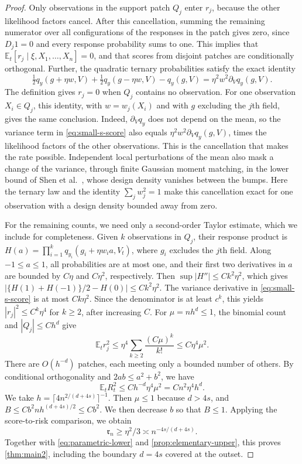 \begin{proof}
Only observations in the support patch $Q_j$ enter $r_j$, because the
other likelihood factors cancel. After this cancellation, summing the remaining numerator over all
configurations of the responses in the patch gives zero, since $D_j1=0$
and every response probability sums to one. This implies that
$\mathbb E_t[r_j\mid\xi,X_1,\ldots,X_n]=0$, and that scores from
disjoint patches are conditionally orthogonal. Further, the
quadratic ternary probabilities satisfy the exact identity
\[
 \tfrac12q_y(g+\eta w,V)+\tfrac12q_y(g-\eta w,V)-q_y(g,V)
 =\eta^2w^2\partial_Vq_y(g,V).
\]
The definition gives $r_j=0$ when $Q_j$ contains no observation. For
one observation $X_i\in Q_j$, this identity, with $w=w_j(X_i)$ and with
$g$ excluding the $j$th field, gives the same conclusion. Indeed,
$\partial_Vq_y$ does not depend on the mean, so the variance term in
\eqref{eq:small-s-score} also equals $\eta^2w^2\partial_Vq_y(g,V)$,
times the likelihood factors of the other observations.
This is the cancellation that makes the rate possible.
Independent local perturbations of the mean also mask a change of the
variance, through finite Gaussian moment matching, in the lower bound of
Shen et al.\ \cite[Sections~2.2 and~5]{ShenGaoWittenHan2020}, whose
design density vanishes between the bumps. Here the ternary law and the
identity $\sum_jw_j^2=1$ make this cancellation exact for one
observation with a design density bounded away from zero.

For the remaining counts, we need only a second-order Taylor
estimate, which we include for completeness. Given $k$ observations in
$Q_j$, their response product is $H(a)=\prod_{i=1}^kq_{y_i}(g_i+\eta w_i a,V_t)$, where
$g_i$ excludes the $j$th field. Along $-1\le a\le1$, all probabilities
are at most one, and their first two derivatives in $a$ are bounded by
$C\eta$ and $C\eta^2$, respectively. Then
$\sup|H''|\le Ck^2\eta^2$, which gives
$|\{H(1)+H(-1)\}/2-H(0)|\le Ck^2\eta^2$.
The variance derivative in \eqref{eq:small-s-score} is at most
$Ck\eta^2$. Since the denominator is at least $c^k$, this yields
$|r_j|^2\le C^k\eta^4$ for $k\ge2$, after increasing $C$.
For $\mu=nh^d\le1$, the binomial count and $|Q_j|\le Ch^d$ give
\[
 \mathbb E_t r_j^2\le
 \eta^4\sum_{k\ge2}\frac{(C\mu)^k}{k!}
 \le C\eta^4\mu^2.
\]
There are $O(h^{-d})$ patches, each meeting only a bounded number of
others. By conditional orthogonality and $2ab\le a^2+b^2$, we have
\[
 \mathbb E_tR_t^2\le C h^{-d}\eta^4\mu^2
 =Cn^2\eta^4h^d.
\]
We take $h=\lceil4n^{2/(d+4s)}\rceil^{-1}$. Then $\mu\le1$ because
$d>4s$, and $B\le Cb^2n h^{(d+4s)/2}\le Cb^2$.
We then decrease $b$ so that $B\le1$. Applying the score-to-risk
comparison, we obtain
\[
 \mathfrak r_n\ge\eta^2/3\asymp n^{-4s/(d+4s)}.
\]
Together with \eqref{eq:parametric-lower} and
\cref{prop:elementary-upper}, this proves \cref{thm:main2}, including
the boundary $d=4s$ covered at the outset.
\end{proof}
